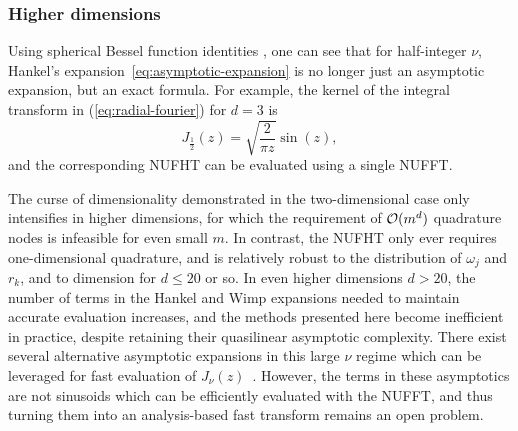 
\subsubsection{Higher dimensions}

Using spherical Bessel function identities \cite[10.47.3,
10.49.2]{olver2010nist}, one can see that for half-integer $\nu$, Hankel's
expansion~\eqref{eq:asymptotic-expansion} is no longer just an asymptotic
expansion, but an exact formula.
For example, the kernel of the integral transform in (\ref{eq:radial-fourier})
for $d = 3$ is
\begin{equation}
  J_{\frac{1}{2}}(z) = \sqrt{\frac{2}{\pi z}} \sin(z),
\end{equation}
and the corresponding NUFHT can be evaluated using a single NUFFT.

The curse of dimensionality demonstrated in the two-dimensional case only
intensifies in higher dimensions, for which the requirement of $\mathcal{O}(m^d)$
quadrature nodes is infeasible for even small $m$. In contrast, the NUFHT only
ever requires one-dimensional quadrature, and is relatively robust to the
distribution of $\omega_j$ and $r_k$, and to dimension for $d \leq 20$ or so. In
even higher dimensions $d > 20$, the number of terms in the Hankel and Wimp
expansions needed to maintain accurate evaluation increases, and the methods
presented here become inefficient in practice, despite retaining their
quasilinear asymptotic complexity. There exist several alternative asymptotic
expansions in this large $\nu$ regime which can be leveraged for fast evaluation
of $J_\nu(z)$~\cite{heitman2015asymptotics, olver2010nist}.
However, the terms in these asymptotics are not sinusoids which can be
efficiently evaluated with the NUFFT, and thus turning them into an
analysis-based fast transform remains an open problem.
